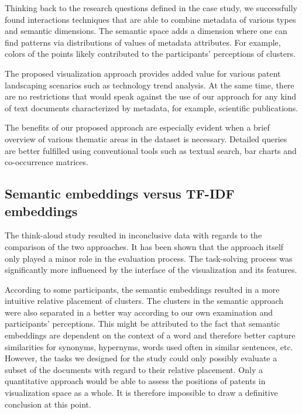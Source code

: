 Thinking back to the research questions defined in the case study, we successfully found interactions techniques that are able to combine metadata of various types and semantic dimensions.
The semantic space adds a dimension where one can find patterns via distributions of values of metadata attributes.
For example, colors of the points likely contributed to the participants' perceptions of clusters.

The proposed visualization approach provides added value for various patent landscaping scenarios such as technology trend analysis.
At the same time, there are no restrictions that would speak against the use of our approach for any kind of text documents characterized by metadata, for example, scientific publications.

The benefits of our proposed approach are especially evident when a brief overview of various thematic areas in the dataset is necessary.
Detailed queries are better fulfilled using conventional tools such as textual search, bar charts and co-occurrence matrices.

\subsection{Semantic embeddings versus TF-IDF embeddings}

The think-aloud study resulted in inconclusive data with regards to the comparison of the two approaches.
It has been shown that the approach itself only played a minor role in the evaluation process.
The task-solving process was significantly more influenced by the interface of the visualization and its features.

According to some participants, the semantic embeddings resulted in a more intuitive relative placement of clusters.
The clusters in the semantic approach were also separated in a better way according to our own examination and participants' perceptions.
This might be attributed to the fact that semantic embeddings are dependent on the context of a word and therefore better capture similarities for synonyms, hypernyms, words used often in similar sentences, etc.
However, the tasks we designed for the study could only possibly evaluate a subset of the documents with regard to their relative placement.
Only a quantitative approach would be able to assess the positions of patents in visualization space as a whole.
It is therefore impossible to draw a definitive conclusion at this point.
